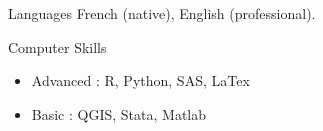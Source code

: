\documentclass{resume} %
\begin{document}
\begin{rSection}{Languages}
French (native), English (professional).
\vspace*{5mm}
\end{rSection}

\begin{rSection}{Computer Skills}
\begin{itemize}
	\item Advanced : R, Python, SAS, LaTex 
	\item Basic : QGIS, Stata, Matlab 
\end{itemize}
\end{rSection}
\end{document}
